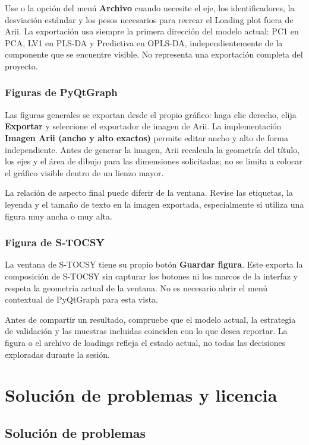 \documentclass[11pt,a4paper,openany]{report}
\newcommand{\menu}[1]{\textbf{#1}}
\newcommand{\tecla}[1]{\fbox{\strut\textsf{#1}}}
\begin{document}
Use \tecla{Ctrl+E} o la opción del menú \menu{Archivo} cuando necesite el eje,
los identificadores, la desviación estándar y los pesos necesarios para recrear
el Loading plot fuera de Arii. La exportación usa siempre la primera dirección
del modelo actual: PC1 en PCA, LV1 en PLS-DA y Predictiva en OPLS-DA,
independientemente de la componente que se encuentre visible. No representa una
exportación completa del proyecto.

\subsection{Figuras de PyQtGraph}

Las figuras generales se exportan desde el propio gráfico: haga clic derecho,
elija \menu{Exportar} y seleccione el exportador de imagen de Arii. La
implementación \menu{Imagen Arii (ancho y alto exactos)} permite editar ancho y
alto de forma independiente. Antes de generar la imagen, Arii recalcula la
geometría del título, los ejes y el área de dibujo para las dimensiones
solicitadas; no se limita a colocar el gráfico visible dentro de un lienzo mayor.

La relación de aspecto final puede diferir de la ventana. Revise las etiquetas,
la leyenda y el tamaño de texto en la imagen exportada, especialmente si utiliza
una figura muy ancha o muy alta.

\subsection{Figura de S-TOCSY}

La ventana de S-TOCSY tiene su propio botón \menu{Guardar figura}. Este exporta
la composición de S-TOCSY sin capturar los botones ni los marcos de la interfaz y
respeta la geometría actual de la ventana. No es necesario abrir el menú
contextual de PyQtGraph para esta vista.

Antes de compartir un resultado, compruebe que el modelo actual, la estrategia
de validación y las muestras incluidas coinciden con lo que desea reportar. La
figura o el archivo de loadings refleja el estado actual, no todas las decisiones
exploradas durante la sesión.

\chapter{Solución de problemas y licencia}

\section{Solución de problemas}
\end{document}
